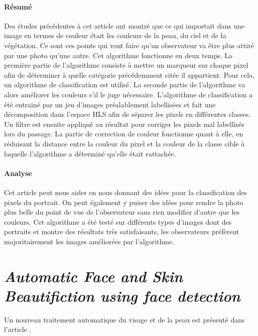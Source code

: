 \documentclass[11pt, french]{report-rd-info}
\begin{document}
\paragraph{Résumé}
Des études précédentes à cet article ont montré que ce qui importait dans une image en termes de couleur était les couleurs de la peau, du ciel et de la végétation. Ce sont ces points qui vont faire qu'un observateur va être plus attiré par une photo qu'une autre. Cet algorithme fonctionne en deux temps. La première partie de l'algorithme consiste à mettre un marqueur sur chaque pixel afin de déterminer à quelle catégorie précédemment citée il appartient. Pour cela, un algorithme de classification est utilisé. La seconde partie de l'algorithme va alors améliorer les couleurs s'il le juge nécessaire.
L'algorithme de classification a été entrainé par un jeu d'images préalablement labellisées et fait une décomposition dans l'espace HLS afin de séparer les pixels en différentes classes. Un filtre est ensuite appliqué au résultat pour corriger les pixels mal labellisés lors du passage.
La partie de correction de couleur fonctionne quant à elle, en réduisant la distance entre la couleur du pixel et la couleur de la classe cible à laquelle l'algorithme a déterminé qu'elle était rattachée.

\paragraph{Analyse}
Cet article peut nous aider en nous donnant des idées pour la classification des pixels du portrait.
On peut également y puiser des idées pour rendre la photo plus belle du point de vue de l'observateur sans rien modifier d'autre que les couleurs.
Cet algorithme a été testé sur différents types d'images dont des portraits et montre des résultats très satisfaisants, les observateurs préfèrent majoritairement les images améliorées par l'algorithme.


\section{\emph{Automatic Face and Skin Beautifiction using face detection}}
Un nouveau traitement automatique du visage et de la peau est présenté dans l’article \cite{Ciuc2010}.
\end{document}
